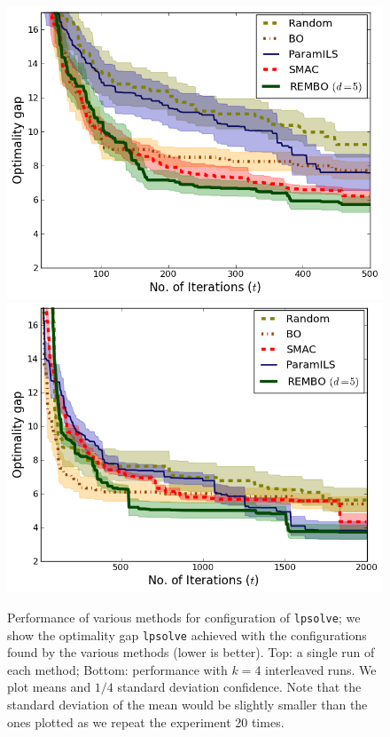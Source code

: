 \documentclass{article}
\begin{document}
\begin{figure}[h!]
\begin{center}
  \includegraphics[scale=0.35]{figures/lpsolve.png}\\
  \includegraphics[scale=0.35]{figures/lpsolve_interleave.png}
  \caption{Performance of various methods for configuration of \texttt{lpsolve}; we show the optimality gap \texttt{lpsolve} achieved with the configurations found by the various methods (lower is better). Top: a single run of each method; Bottom: performance with $k=4$ interleaved runs. We plot means and $1/4$ standard deviation confidence. Note that the standard deviation of the mean would be slightly smaller
than the ones plotted as we repeat the experiment 20 times.}
\label{fig:lpsolve}
\end{center}
\vspace*{-3mm}
\end{figure}
\end{document}
